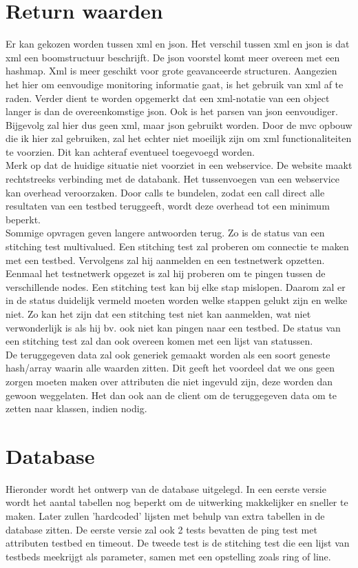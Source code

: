 \documentclass[11pt]{article}
\begin{document}
\section{Return waarden}
Er kan gekozen worden tussen xml en json. Het verschil tussen xml en json is dat xml een boomstructuur beschrijft. De json voorstel komt meer overeen met een hashmap. Xml is meer geschikt voor grote geavanceerde structuren. Aangezien het hier om eenvoudige monitoring informatie gaat, is het gebruik van xml af te raden. Verder dient te worden opgemerkt dat een xml-notatie van een object langer is dan de overeenkomstige json. Ook is het parsen van json eenvoudiger. Bijgevolg zal hier dus geen xml, maar json gebruikt worden. Door de mvc opbouw die ik hier zal gebruiken, zal het echter niet moeilijk zijn om xml functionaliteiten te voorzien. Dit kan achteraf eventueel toegevoegd worden.\\

Merk op dat de huidige situatie niet voorziet in een webservice. De website maakt rechtstreeks verbinding met de databank. Het tussenvoegen van een webservice kan overhead veroorzaken. Door calls te bundelen, zodat een call direct alle resultaten van een testbed teruggeeft, wordt deze overhead tot een minimum beperkt.\\

Sommige opvragen geven langere antwoorden terug. Zo is de status van een stitching test multivalued. Een stitching test zal proberen om connectie te maken met een testbed. Vervolgens zal hij aanmelden en een testnetwerk opzetten. Eenmaal het testnetwerk opgezet is zal hij proberen om te pingen tussen de verschillende nodes. Een stitching test kan bij elke stap mislopen. Daarom zal er in de status duidelijk vermeld moeten worden welke stappen gelukt zijn en welke niet. Zo kan het zijn dat een stitching test niet kan aanmelden, wat niet verwonderlijk is als hij bv. ook niet kan pingen naar een testbed. De status van een stitching test zal dan ook overeen komen met een lijst van statussen.\\

De teruggegeven data zal ook generiek gemaakt worden als een soort geneste hash/array waarin alle waarden zitten. Dit geeft het voordeel dat we ons geen zorgen moeten maken over attributen die niet ingevuld zijn, deze worden dan gewoon weggelaten. Het dan ook aan de client om de teruggegeven data om te zetten naar klassen, indien nodig.

\clearpage
\section{Database}
Hieronder wordt het ontwerp van de database uitgelegd.
In een eerste versie wordt het aantal tabellen nog beperkt om de uitwerking makkelijker en sneller te maken.
Later zullen 'hardcoded' lijsten met behulp van extra tabellen in de database zitten.
De eerste versie zal ook 2 tests bevatten de ping test met attributen testbed en timeout. De tweede test is de stitching test die een lijst van testbeds meekrijgt als parameter, samen met een opstelling zoals ring of line.
\end{document}
